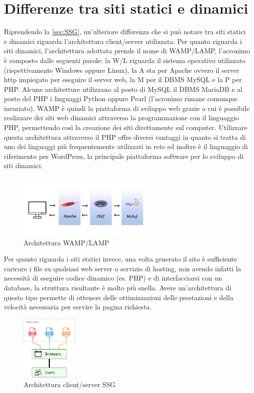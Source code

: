 \documentclass[target=bach,aauheader=]{thud}
\begin{document}
\section{Differenze tra siti statici e dinamici}
Riprendendo la \cref{sec:SSG}, un'ulteriore differenza che si può notare tra siti statici e dinamici riguarda l'architettura client/server utilizzata. \newline
Per quanto riguarda i siti dinamici, l'architettura adottata prende il nome di WAMP/LAMP, l'acronimo è composto dalle seguenti parole: la W/L riguarda il sistema operativo utilizzato (rispettivamente Windows oppure Linux),
la A sta per Apache ovvero il server http impiegato per eseguire il server web, la M per il DBMS MySQL e la P per PHP. Alcune architetture utilizzano al posto di MySQL il DBMS MariaDB e al posto del PHP i linguaggi Python oppure Pearl (l'acronimo rimane comunque invariato). \newline
WAMP è quindi la piattaforma di sviluppo web grazie a cui è possibile realizzare dei siti web dinamici attraverso la programmazione con il linguaggio PHP, permettendo così la creazione dei siti direttamente sul computer. 
Utilizzare questa architettura attraverso il PHP offre diversi vantaggi in quanto si tratta di uno dei linguaggi più frequentemente utilizzati in rete ed inoltre è il linguaggio di riferimento per WordPress, la principale piattaforma software per lo sviluppo di siti dinamici. 
\begin{figure}
    \centering
    \includegraphics[width = 0.6\textwidth]{images/WAMP_LAMP.png}
    \caption{Architettura WAMP/LAMP}
\end{figure}
\newline
Per quanto riguarda i siti statici invece, una volta generato il sito è sufficiente caricare i file su qualsiasi web server o servizio di hosting, non avendo infatti la necessità di eseguire codice dinamico (es. PHP) e di interfacciarsi con un database, la struttura risultante è molto più snella. 
Avere un'architettura di questo tipo permette di ottenere delle ottimizzazioni delle prestazioni e della velocità necessaria per servire la pagina richiesta. 
\begin{figure}[h]
    \centering
    \includegraphics[width = 0.25\textwidth]{images/static.png}
    \caption{Architettura client/server SSG}
    \label{img:architettura}
\end{figure}
\end{document}
